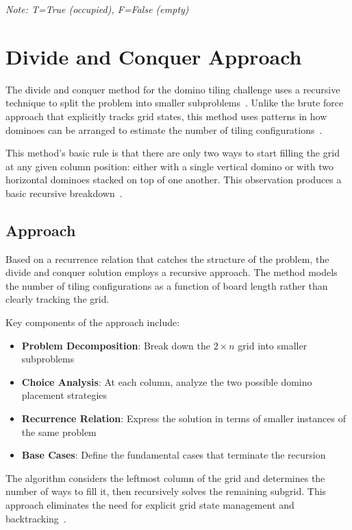 \documentclass[conference]{IEEEtran}
\begin{document}
\textit{Note: T=True (occupied), F=False (empty)}


\section{Divide and Conquer Approach}

The divide and conquer method for the domino tiling challenge uses a recursive technique to split the problem into smaller subproblems~\cite{b1, b2}. Unlike the brute force approach that explicitly tracks grid states, this method uses patterns in how dominoes can be arranged to estimate the number of tiling configurations~\cite{b2}.

This method's basic rule is that there are only two ways to start filling the grid at any given column position: either with a single vertical domino or with two horizontal dominoes stacked on top of one another. This observation produces a basic recursive breakdown~\cite{b1, b5}.

\subsection{Approach}

Based on a recurrence relation that catches the structure of the problem, the divide and conquer solution employs a recursive approach. The method models the number of tiling configurations as a function of board length rather than clearly tracking the grid.

Key components of the approach include:

\begin{itemize}
    \item \textbf{Problem Decomposition}: Break down the $2 \times n$ grid into smaller subproblems
    \item \textbf{Choice Analysis}: At each column, analyze the two possible domino placement strategies
    \item \textbf{Recurrence Relation}: Express the solution in terms of smaller instances of the same problem
    \item \textbf{Base Cases}: Define the fundamental cases that terminate the recursion
\end{itemize}

The algorithm considers the leftmost column of the grid and determines the number of ways to fill it, then recursively solves the remaining subgrid. This approach eliminates the need for explicit grid state management and backtracking~\cite{b2, b3}.
\end{document}
